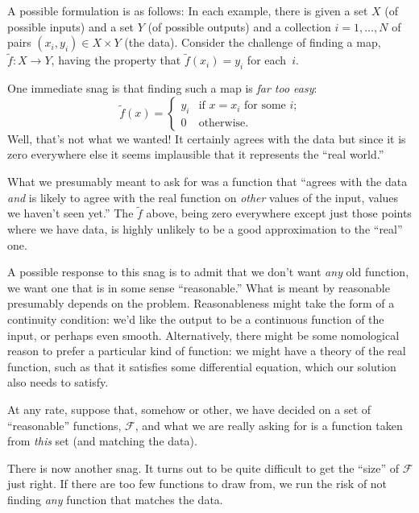 \documentclass[10pt, a4paper]{article}
\begin{document}
A possible formulation is as follows: In each example, there is given
a set $X$ (of possible inputs) and a set $Y$ (of possible outputs) and
a collection $i=1,\dots,N$ of pairs $(x_i, y_i)\in X\times Y$ (the
data). Consider the challenge of finding a map, $\tilde{f}\colon X\to
Y$, having the property that $\tilde{f}(x_i)= y_i$ for each~$i$.

One immediate snag is that finding such a map is \emph{far too easy}:
\begin{equation*}
  \tilde{f}(x) =
  \begin{cases}
    y_i & \text{if $x = x_i$ for some $i$;} \\
      0 & \text{otherwise}.
  \end{cases}
\end{equation*}
Well, that's not what we wanted! It certainly agrees with the data but
since it is zero everywhere else it seems implausible that it
represents the “real world.”

What we presumably meant to ask for was a function that “agrees with
the data \emph{and} is likely to agree with the real function on
\emph{other} values of the input, values we haven't seen yet.” The
$\tilde{f}$ above, being zero everywhere except just those points
where we have data, is highly unlikely to be a good approximation to
the “real” one.

A possible response to this snag is to admit that we don't want
\emph{any} old function, we want one that is in some sense
“reasonable.” What is meant by reasonable presumably depends on the
problem. Reasonableness might take the form of a continuity condition:
we'd like the output to be a continuous function of the input, or
perhaps even smooth. Alternatively, there might be some nomological
reason to prefer a particular kind of function: we might have a theory
of the real function, such as that it satisfies some differential
equation, which our solution also needs to satisfy.

At any rate, suppose that, somehow or other, we have decided on a set
of “reasonable” functions, $\mathcal{F}$, and what we are really asking for is a
function taken from \emph{this} set (and matching the data).

There is now another snag. It turns out to be quite difficult to get
the “size” of $\mathcal{F}$ just right. If there are too few functions to draw
from, we run the risk of not finding \emph{any} function that matches
the data.
\end{document}
